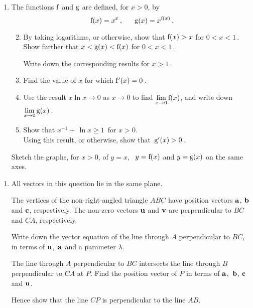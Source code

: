 \documentclass[a4, 11pt]{report}
\newlength{\qspace}
\newcounter{qnumber}
\newenvironment{question}%
 {\vspace{\qspace}
  \begin{enumerate}[\bfseries 1\quad][10]%
    \setcounter{enumi}{\value{qnumber}}%
    \item%
 }
{
  \end{enumerate}
  \filbreak
  \stepcounter{qnumber}
 }
\newenvironment{questionparts}[1][1]%
 {
  \begin{enumerate}[\bfseries (i)]%
    \setcounter{enumii}{#1}
    \addtocounter{enumii}{-1}
    \setlength{\itemsep}{2mm}
    \setlength{\parskip}{5pt}
 }
 {
  \end{enumerate}
 }
\def\e{{\rm e}}
\def\g{{\rm g}}
\def\f{{\rm f}}
\def\ge{\geqslant}
\begin{document}
\begin{question}
The functions $\f$ and $\g$ are defined, for $x>0$, by
\[
\f(x) = x^x\,, \ \ \ \ \ \g(x) = x^{\f(x)}\,.
\]

\begin{questionparts}
\item 
By taking logarithms, 
or otherwise, show that $\f(x)> x$ for $0<x<1\,$.
 Show further that $x<\g(x)<\f(x)$ for $0<x<1\,$. 

Write down the 
corresponding results for $x>1 \,$. 

\item
Find the value of 
$x$ for which $\f'(x)=0\,$. 

\item
Use the result $x\ln x \to 0$ as $x\to 0$ 
to
find  $\lim\limits_{x\to0}\f(x)$,  
and write down   $\lim\limits_{x\to0}\g(x)\,$. 

\item
Show that $  x^{-1}+\, \ln x \ge 1\,$ for $x>0$. 
\\[5pt]
Using this result, or otherwise, 
show 
that~$\g'(x) >0\,$.
\end{questionparts}

\vspace{3pt}
Sketch the graphs, for $x>0$,  of $y=x$, \ $y=\f(x)$ and $y=\g(x)$ 
on the same axes.
  

\end{question}




\begin{question}
All vectors in this question lie in the same plane.

 
The vertices of the non-right-angled triangle $ABC$ have position 
vectors $\bf a$, $\bf b$ and $\bf c$, respectively.
The non-zero vectors $\bf u$ and $\bf v$ are
perpendicular to $BC$ and $CA$, respectively.


Write down the vector equation of the line through $A$
perpendicular to $BC$, in terms of 
 $\bf u$,~$\bf a$  
and  a parameter $\lambda $.

The line through $A$ perpendicular
to $BC$ intersects  the line through $B$ perpendicular to $CA$ at $P$. 
Find
the position
vector  of $P$
 in terms of $\bf a$,~$\bf b$, $\bf c$ and $\bf u$.

Hence show that
 the line $CP$ is perpendicular to the line $AB$.



\end{question}
\end{document}
